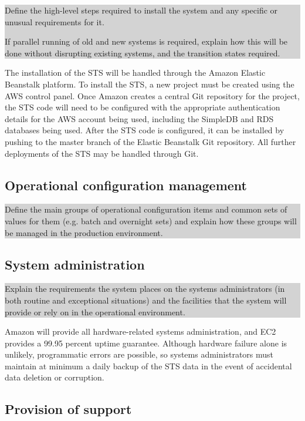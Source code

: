 \documentclass[a4paper,11pt]{report}
\newcommand{\instructions}[1]{
  \noindent\colorbox{lightgray}{%
    \parbox{\linewidth}{%
      #1
    }%
  }%
 \vspace{0.1cm}
}
\begin{document}
\instructions{
Define the high-level steps required to install the system and any
specific or unusual requirements for it.

If parallel running of old and new systems is required, explain how
this will be done without disrupting existing systems, and the
transition states required.
}

The installation of the STS will be handled through the Amazon Elastic Beanstalk
platform. To install the STS, a new project must be created using the AWS
control panel. Once Amazon creates a central Git repository for the project, the
STS code will need to be configured with the appropriate authentication details
for the AWS account being used, including the SimpleDB and RDS databases being
used. After the STS code is configured, it can be installed by pushing to the
master branch of the Elastic Beanstalk Git repository. All further deployments
of the STS may be handled through Git.

\subsection{Operational configuration management}
\label{sec:oper-conf-manag}

\instructions{
Define the main groups of operational configuration items and common
sets of values for them (e.g. batch and overnight sets) and explain
how these groups will be managed in the production environment.
}

\subsection{System administration}
\label{sec:syst-admin}

\instructions{
Explain the requirements the system places on the systems
administrators (in both routine and exceptional situations) and the
facilities that the system will provide or rely on in the operational
environment.
}

Amazon will provide all hardware-related systems administration, and EC2 
provides a 99.95 percent uptime guarantee. Although hardware failure alone is
unlikely, programmatic errors are possible, so systems administrators must
maintain at minimum a daily backup of the STS data in the event of accidental
data deletion or corruption. 

\subsection{Provision of support}
\label{sec:provision-support}
\end{document}
